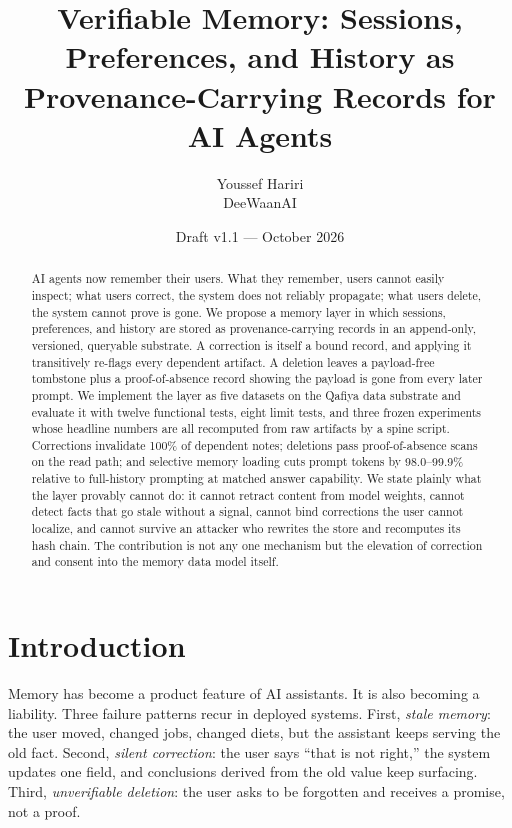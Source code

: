 \documentclass[11pt]{article}
\title{\textbf{Verifiable Memory: Sessions, Preferences, and History as\\ Provenance-Carrying Records for AI Agents}}
\author{Youssef Hariri\\ DeeWaanAI}
\date{Draft v1.1 --- October 2026}
\begin{document}
\maketitle

\begin{abstract}
\noindent AI agents now remember their users. What they remember, users cannot easily inspect; what users correct, the system does not reliably propagate; what users delete, the system cannot prove is gone. We propose a memory layer in which sessions, preferences, and history are stored as provenance-carrying records in an append-only, versioned, queryable substrate. A correction is itself a bound record, and applying it transitively re-flags every dependent artifact. A deletion leaves a payload-free tombstone plus a proof-of-absence record showing the payload is gone from every later prompt. We implement the layer as five datasets on the Qafiya data substrate and evaluate it with twelve functional tests, eight limit tests, and three frozen experiments whose headline numbers are all recomputed from raw artifacts by a spine script. Corrections invalidate 100\% of dependent notes; deletions pass proof-of-absence scans on the read path; and selective memory loading cuts prompt tokens by 98.0--99.9\% relative to full-history prompting at matched answer capability. We state plainly what the layer provably cannot do: it cannot retract content from model weights, cannot detect facts that go stale without a signal, cannot bind corrections the user cannot localize, and cannot survive an attacker who rewrites the store and recomputes its hash chain. The contribution is not any one mechanism but the elevation of correction and consent into the memory data model itself.
\end{abstract}

\section{Introduction}
Memory has become a product feature of AI assistants. It is also becoming a liability. Three failure patterns recur in deployed systems. First, \emph{stale memory}: the user moved, changed jobs, changed diets, but the assistant keeps serving the old fact. Second, \emph{silent correction}: the user says ``that is not right,'' the system updates one field, and conclusions derived from the old value keep surfacing. Third, \emph{unverifiable deletion}: the user asks to be forgotten and receives a promise, not a proof.
\end{document}
